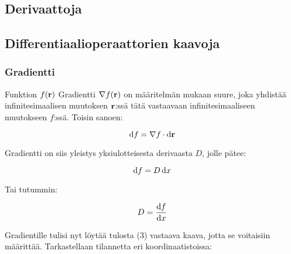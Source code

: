 \documentclass[../johdoksia.tex]{subfiles}
\begin{document}
	\subsection{Derivaattoja}
	
	\subsection{Differentiaalioperaattorien kaavoja}
	
	\subsubsection{Gradientti}
	
	Funktion $f(\mathbf{r})$ Gradientti $\nabla f(\mathbf{r})$ on määritelmän mukaan suure, joka yhdistää infinitesimaalisen muutoksen $\mathbf{r}$:ssä tätä vastaavaan infinitesimaaliseen muutokseen $f$:ssä. Toisin sanoen:
	
	\begin{equation}
		\odif{f} = \nabla f\cdot\odif{\vtr{r}}
	\end{equation}
	
	Gradientti on siis yleistys yksiulotteisesta derivaasta $D$, jolle pätee:
	
	\begin{equation}
		\odif{f} = D\odif{x}
	\end{equation}
	
	Tai tutummin:
	
	\begin{equation}
		D = \odv{f}{x}
	\end{equation}
	
	Gradientille tulisi nyt löytää tulosta (3) vastaava kaava, jotta se voitaisiin määrittää. Tarkastellaan tilannetta eri koordinaatistoissa:
	
\end{document}
